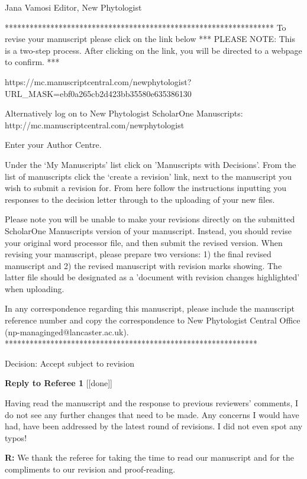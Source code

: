 \documentclass[12pt]{letter}
\newenvironment{refquote}{\bigskip \begin{it}}{\end{it}\smallskip}
\begin{document}
Jana Vamosi
Editor, New Phytologist

*****************************************************************
To revise your manuscript please click on the link below
*** PLEASE NOTE: This is a two-step process. After clicking on the link, you will be directed to a webpage to confirm. ***

https://mc.manuscriptcentral.com/newphytologist?URL_MASK=ebf0a265cb2d423bb35580e635386130

Alternatively log on to New Phytologist ScholarOne Manuscripts:
http://mc.manuscriptcentral.com/newphytologist

Enter your Author Centre.

Under the ‘My Manuscripts' list click on 'Manuscripts with Decisions'. From the list of manuscripts click the ‘create a revision' link, next to the manuscript you wish to submit a revision for. From here follow the instructions inputting you responses to the decision letter through to the uploading of your new files.

Please note you will be unable to make your revisions directly on the submitted ScholarOne Manuscripts version of your manuscript. Instead, you should revise your original word processor file, and then submit the revised version. When revising your manuscript, please prepare two versions: 1) the final revised manuscript and 2) the revised manuscript with revision marks showing. The latter file should be designated as a 'document with revision changes highlighted' when uploading.

In any correspondence regarding this manuscript, please include the manuscript reference number and copy the correspondence to New Phytologist Central Office (np-managinged@lancaster.ac.uk).
*************************************************************


Decision: Accept subject to revision

\clearpage

{\Large \bf Reply to Referee 1} [[done]]

	\begin{refquote}
	Having read the manuscript and the response to previous reviewers’ comments, I do not see any further changes that need to be made. Any concerns I would have had, have been addressed by the latest round of revisions. I did not even spot any typos!
	\end{refquote}

	\textbf{R:} We thank the referee for taking the time to read our manuscript and for the compliments to our revision and proof-reading.
\end{document}
